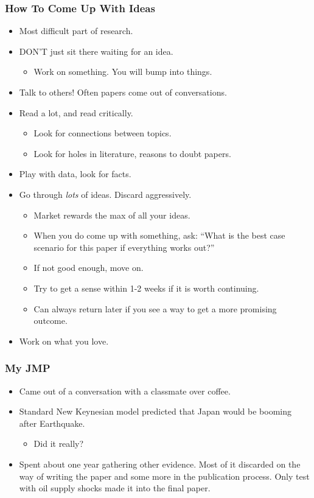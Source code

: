 \documentclass[english,xcolor=svgnames]{beamer}
\begin{document}
\begin{frame}
\frametitle[alignment=center]{How To Come Up With Ideas}
\begin{itemize}
	\item Most difficult part of research.
	\item DON'T just sit there waiting for an idea.
	\begin{itemize}
		\item Work on something. You will bump into things.
	\end{itemize}
	\item Talk to others! Often papers come out of conversations.
	\item Read a lot, and read critically.
	\begin{itemize}
		\item Look for connections between topics.
		\item Look for holes in literature, reasons to doubt papers.
	\end{itemize}
	\item Play with data, look for facts.
	\item Go through \emph{lots} of ideas. Discard aggressively.
	\begin{itemize}
		\item Market rewards the max of all your ideas.
		\item When you do come up with something, ask: ``What is the best case scenario for this paper if everything works out?''
		\item If not good enough, move on. 
		\item Try to get a sense within 1-2 weeks if it is worth continuing. 
		\item Can always return later if you see a way to get a more promising outcome.
	\end{itemize}
	\item Work on what you love.
\end{itemize}
\end{frame}


\begin{frame}
\frametitle[alignment=center]{My JMP}
\begin{itemize}
	\item Came out of a conversation with a classmate over coffee.
	\item Standard New Keynesian model predicted that Japan would be booming after Earthquake.
	\begin{itemize}
		\item Did it really?
	\end{itemize}
	\item Spent about one year gathering other evidence. Most of it discarded on the way of writing the paper and some more in the publication process. Only test with oil supply shocks made it into the final paper.
\end{itemize}
\end{frame}
\end{document}
